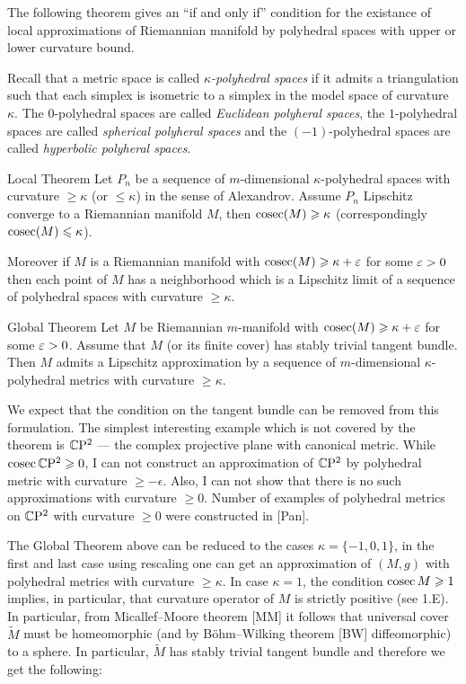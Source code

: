 \documentclass{article}
\begin{document}
The following theorem gives an ``if and only if'' condition for the existance of local approximations of Riemannian manifold by polyhedral spaces with upper or lower curvature bound.

Recall that a metric space is called \emph{$\kappa$-polyhedral spaces} if it admits a triangulation such that each simplex is isometric to a simplex in the model space of curvature $\kappa$.
The $0$-polyhedral spaces are called \emph{Euclidean polyheral spaces},
the $1$-polyhedral spaces are called \emph{spherical polyheral spaces}
and
the $(-1)$-polyhedral spaces are called \emph{hyperbolic polyheral spaces}.

\begin{thm}{Local Theorem}
 Let $P_n$ be a sequence of $m$-dimensional $\kappa$-polyhedral spaces
with curvature $\ge \kappa$ (or $\le\kappa$) in the sense of Alexandrov.
Assume $P_n$ Lipschitz converge to a Riemannian manifold $M$, then $\mathop{\rm cosec}\nolimits(M)\geqslant \kappa$ (correspondingly $\mathop{\rm cosec}\nolimits(M)\leqslant \kappa$).

Moreover if $M$ is a Riemannian manifold with $\mathop{\rm cosec}\nolimits(M)\geqslant\kappa+\varepsilon$ for some $\varepsilon>0$
then each point of $M$ has a neighborhood which is a Lipschitz limit of a sequence of
polyhedral spaces with curvature $\ge \kappa$.
\end{thm}


\begin{thm}{Global Theorem} 
Let $M$ be Riemannian $m$-manifold with $\cosec(M)\z\ge \kappa+\eps$ for some $\varepsilon>0$.
Assume that $M$ (or its finite cover) has
stably trivial tangent bundle.
Then $M$ admits a Lipschitz approximation
by a sequence of $m$-dimensional $\kappa$-polyhedral metrics with curvature
$\ge \kappa$.
\end{thm}

We expect that the condition on the tangent bundle can be
removed from this formulation.
The simplest interesting example which is not covered by the theorem is $\mathbb{C}\mathrm{P}^2$ ---
the complex projective plane with canonical metric.
While
$\mathop{\rm cosec}\nolimits\mathbb{C}\mathrm{P}^2\geqslant 0$,
I can not construct an approximation of $\mathbb{C}\mathrm{P}^2$ by polyhedral metric with curvature $\ge -\epsilon$.
Also, I can not show that there is no such approximations with curvature $\ge 0$.
Number of examples of polyhedral metrics on $\mathbb{C}\mathrm{P}^2$ with curvature $\ge 0$ were constructed in [Pan].

The Global Theorem above can be reduced to the cases $\kappa= \{-1,0,1\}$,
in the first and last case using rescaling one can get an approximation
of $(M,g)$ with polyhedral metrics with curvature $\ge \kappa$.
In case $\kappa=1$, the condition $\mathop{\rm cosec}\nolimits M\geqslant 1$ implies, in particular, that curvature
operator of $M$ is strictly positive (see 1.E).
In particular, from Micallef--Moore theorem [MM] it follows that universal cover $\widetilde M$ must be homeomorphic (and by B\"ohm--Wilking theorem [BW] diffeomorphic) to
a sphere.
In particular, $\widetilde M$ has stably trivial tangent bundle and therefore
we get the following:
\end{document}
